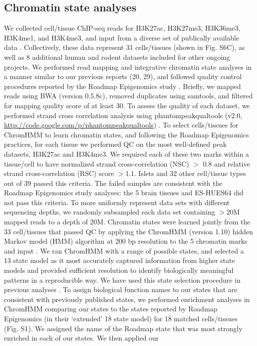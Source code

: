\subsection{Chromatin state analyses}
We collected cell/tissue ChIP-seq reads for H3K27ac, H3K27me3, H3K36me3, H3K4me1, and H3K4me3, and input from a diverse set of publically available data \cite{theroadmapepigenomicsconsortiumIntegrativeAnalysis1112015, ernstMappingAnalysisChromatin2011, mikkelsenComparativeEpigenomicAnalysis2010, parkerChromatinStretchEnhancer2013}. Collectively, these data represent 31 cells/tissues (shown in Fig. S6C), as well as 8 additional human and rodent datasets included for other ongoing projects. We performed read mapping and integrative chromatin state analyses in a manner similar to our previous reports (20, 29), and followed quality control procedures reported by the Roadmap Epigenomics study \cite{theroadmapepigenomicsconsortiumIntegrativeAnalysis1112015}. Briefly, we mapped reads using BWA \cite{liFastAccurateShort2009a} (version 0.5.8c), removed duplicates using samtools, and filtered for mapping quality score of at least 30. To assess the quality of each dataset, we performed strand cross correlation analysis using phantompeakqualtools  (v2.0, \url{http://code.google.com/p/phantompeakqualtools}) \cite{theroadmapepigenomicsconsortiumIntegrativeAnalysis1112015}. To select cells/tissues for ChromHMM to learn chromatin states, and following the Roadmap Epigenomics practices, for each tissue we performed QC on the most well-defined peak datasets, H3K27ac and H3K4me3. We required each of these two marks within a tissue/cell to have normalized strand cross-correlation (NSC) $>$ 0.8 and relative strand cross-correlation (RSC) score $>$1.1. Islets and 32 other cell/tissue types out of 39 passed this criteria.  The failed samples are consistent with the Roadmap Epigenomics study analyses: the 5 brain tissues and ES-HUES64 did not pass this criteria. To more uniformly represent data sets with different sequencing depths, we randomly subsampled each data set containing $>$20M mapped reads to a depth of 20M. Chromatin states were learned jointly from the 33 cell/tissues that passed QC by applying the ChromHMM (version 1.10) hidden Markov model (HMM) algorithm at 200 bp resolution to the 5 chromatin marks and input \cite{ernstMappingAnalysisChromatin2011, ernstChromHMMAutomatingChromatin2012, ernstDiscoveryCharacterizationChromatin2010}. We ran ChromHMM with a range of possible states, and selected a 13 state model as it most accurately captured information from higher state models and provided sufficient resolution to identify biologically meaningful patterns in a reproducible way. We have used this state selection procedure in previous analyses \cite{scottGeneticRegulatorySignature2016, parkerChromatinStretchEnhancer2013}. To assign biological function names to our states that are consistent with previously published states, we performed enrichment analyses in ChromHMM comparing our states to the states reported by Roadmap Epigenomics (in their ‘extended’ 18 state model) \cite{theroadmapepigenomicsconsortiumIntegrativeAnalysis1112015} for 18 matched cells/tissues (Fig. S1). We assigned the name of the Roadmap state that was most strongly enriched in each of our states. We then applied our 